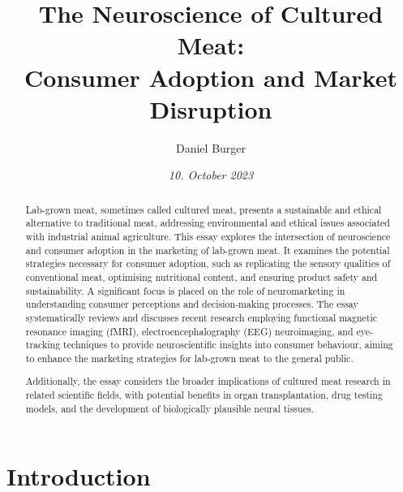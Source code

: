 \documentclass[10pt]{article}
\title{\textbf{The Neuroscience of Cultured Meat:}\\ Consumer Adoption and Market Disruption}
\author[ ]{Daniel Burger}
\affil[ ]{\textbf{King’s College London}}
\affil[ ]{\href{mailto:public@danielburger.online}{public@danielburger.online}}
\date{\textit{10. October 2023}}
\begin{document}

\maketitle


\begin{sloppypar} %
  \begin{abstract}
    Lab-grown meat, sometimes called cultured meat, presents a sustainable and ethical alternative to traditional meat, addressing environmental and ethical issues associated with industrial animal agriculture. This essay explores the intersection of neuroscience and consumer adoption in the marketing of lab-grown meat. It examines the potential strategies necessary for consumer adoption, such as replicating the sensory qualities of conventional meat, optimising nutritional content, and ensuring product safety and sustainability. A significant focus is placed on the role of neuromarketing in understanding consumer perceptions and decision-making processes. The essay systematically reviews and discusses recent research employing functional magnetic resonance imaging (fMRI), electroencephalography (EEG) neuroimaging, and eye-tracking techniques to provide neuroscientific insights into consumer behaviour, aiming to enhance the marketing strategies for lab-grown meat to the general public.

    Additionally, the essay considers the broader implications of cultured meat research in related scientific fields, with potential benefits in organ transplantation, drug testing models, and the development of biologically plausible neural tissues.
  \end{abstract}
  \pagebreak

  \tableofcontents
  \pagebreak

  \listoffigures
  \pagebreak



  \section{Introduction}
  \label{sec:introduction}


\end{sloppypar}
\end{document}
